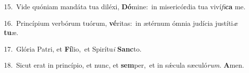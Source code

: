 {\numbfont\textcolor{\numbcolor}{15.}}~Vide quóniam mandáta tua diléxi, \textbf{Dó}\-mine:~\star in misericórdia tua viví\-\textit{fi}\-\textbf{ca} me.\par
{\numbfont\textcolor{\numbcolor}{16.}}~Princípium verbórum tuórum, \textbf{vé}\-ritas:~\star in ætérnum ómnia judícia justíti\textit{æ} \textbf{tu}\-æ.\par
{\numbfont\textcolor{\numbcolor}{17.}}~Glória Patri, et \textbf{Fí}\-lio,~\star et Spirítu\textit{i} \textbf{Sanc}\-to.\par
{\numbfont\textcolor{\numbcolor}{18.}}~Sicut erat in princípio, et nunc, et \textbf{sem}\-per,~\star et in sǽcula sæculó\-\textit{rum}\-. \textbf{A}\-men.\par
